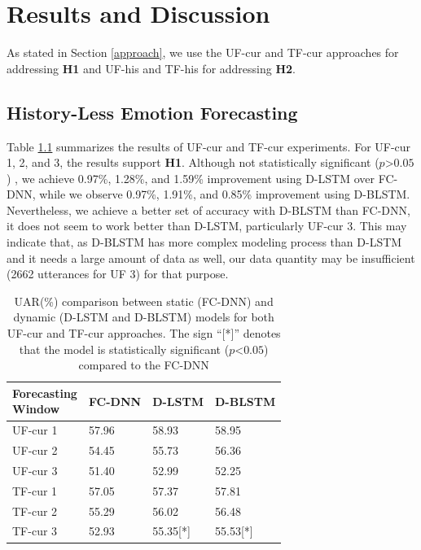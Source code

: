 \newpage
\chapter{Results and Discussion}
\label{result_and_discuss}

As stated in Section \ref{approach}, we  use the UF-cur and TF-cur approaches for addressing \textbf{H1} and UF-his and TF-his for addressing \textbf{H2}. 


\section{History-Less Emotion Forecasting}

Table \ref{tab:history-less} summarizes the results of UF-cur and TF-cur experiments. For UF-cur 1, 2, and 3, the results support  \textbf{H1}. Although not statistically significant ($p$\textgreater$0.05$) , we achieve 0.97\%, 1.28\%, and 1.59\% improvement using D-LSTM over FC-DNN, while we observe  0.97\%, 1.91\%, and 0.85\% improvement using D-BLSTM. Nevertheless, we achieve a better set of accuracy with D-BLSTM than FC-DNN, it does not seem to work better than D-LSTM, particularly UF-cur 3. This may indicate that, as D-BLSTM has more complex modeling process than D-LSTM and it needs a large amount of data as well, our data quantity may be insufficient (2662 utterances for UF 3) for that purpose.

\begin{table}[h]
\centering
\caption{UAR(\%) comparison between static (FC-DNN)  and dynamic  (D-LSTM and D-BLSTM) models for both UF-cur and TF-cur approaches. The sign ``[*]'' denotes that the model is statistically significant ($p$\textless$0.05$) compared to the FC-DNN}
\begin{tabular}{l  l  l  l}
\hline

\makecell{\textbf{Forecasting}\\\textbf{Window}} & \makecell{\textbf{FC-DNN}\\} &  \makecell{\textbf{D-LSTM}\\} & \makecell{\textbf{D-BLSTM}\\} \\
\hline
\hline
UF-cur 1 & 57.96 & 58.93 & 58.95 \\

UF-cur 2 & 54.45 & 55.73 & 56.36\\      

UF-cur 3 & 51.40 & 52.99 & 52.25\\
\hline
TF-cur 1 & 57.05 & 57.37 & 57.81 \\

TF-cur 2 & 55.29 & 56.02 & 56.48\\      

TF-cur 3 & 52.93 & 55.35[*] & 55.53[*]\\
\hline
\end{tabular}
\label{tab:history-less}
\end{table}

